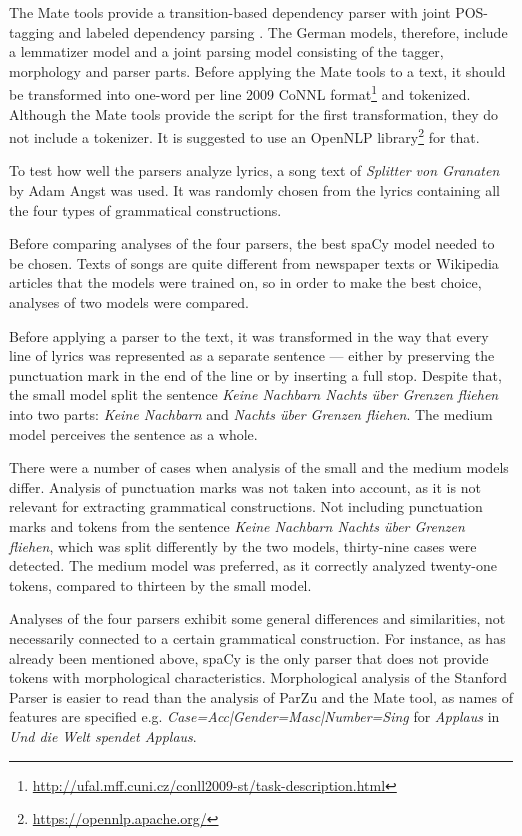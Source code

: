 The Mate tools provide a transition-based dependency parser with joint POS-tagging and labeled dependency parsing \citep{Bohnet.2012}. The German models, therefore, include a lemmatizer model and a joint parsing model consisting of the tagger, morphology and parser parts. Before applying the Mate tools to a text, it should be transformed into one-word per line 2009 CoNNL format\footnote{\url{http://ufal.mff.cuni.cz/conll2009-st/task-description.html}} and tokenized. Although the Mate tools provide the script for the first transformation, they do not include a tokenizer. It is suggested to use an OpenNLP library\footnote{\url{https://opennlp.apache.org/}} for that.

To test how well the parsers analyze lyrics, a song text of \textit{Splitter von Granaten} by Adam Angst was used. It was randomly chosen from the lyrics containing all the four types of grammatical constructions.

Before comparing analyses of the four parsers, the best spaCy model needed to be chosen. Texts of songs are quite different from newspaper texts or Wikipedia articles that the models were trained on, so in order to make the best choice, analyses of two models were compared.

Before applying a parser to the text, it was transformed in the way that every line of lyrics was represented as a separate sentence --- either by preserving the punctuation mark in the end of the line or by inserting a full stop. Despite that, the small model split the sentence \textit{Keine Nachbarn Nachts über Grenzen fliehen} into two parts: \textit{Keine Nachbarn} and \textit{Nachts über Grenzen fliehen}. The medium model perceives the sentence as a whole. 

There were a number of cases when analysis of the small and the medium models differ. Analysis of punctuation marks was not taken into account, as it is not relevant for extracting grammatical constructions. Not including punctuation marks and tokens from the sentence \textit{Keine Nachbarn Nachts über Grenzen fliehen}, which was split differently by the two models, thirty-nine cases were detected. The medium model was preferred, as it correctly analyzed twenty-one tokens, compared to thirteen by the small model.

Analyses of the four parsers exhibit some general differences and similarities, not necessarily connected to a certain grammatical construction. For instance, as has already been mentioned above, spaCy is the only parser that does not provide tokens with morphological characteristics. Morphological analysis of the Stanford Parser is easier to read than the analysis of ParZu and the Mate tool, as names of features are specified e.g. \textit{Case=Acc|Gender=Masc|Number=Sing} for \textit{Applaus} in \textit{Und die Welt spendet Applaus}. 

